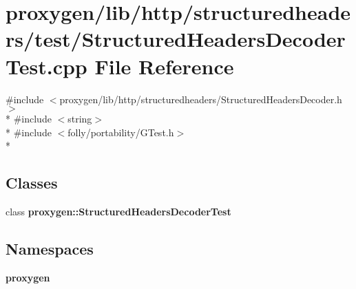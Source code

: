 \section{proxygen/lib/http/structuredheaders/test/\+Structured\+Headers\+Decoder\+Test.cpp File Reference}
\label{StructuredHeadersDecoderTest_8cpp}
{\ttfamily \#include $<$proxygen/lib/http/structuredheaders/\+Structured\+Headers\+Decoder.\+h$>$}\\*
{\ttfamily \#include $<$string$>$}\\*
{\ttfamily \#include $<$folly/portability/\+G\+Test.\+h$>$}\\*
\subsection*{Classes}
\begin{DoxyCompactItemize}
\item 
class {\bf proxygen\+::\+Structured\+Headers\+Decoder\+Test}
\end{DoxyCompactItemize}
\subsection*{Namespaces}
\begin{DoxyCompactItemize}
\item 
 {\bf proxygen}
\end{DoxyCompactItemize}
